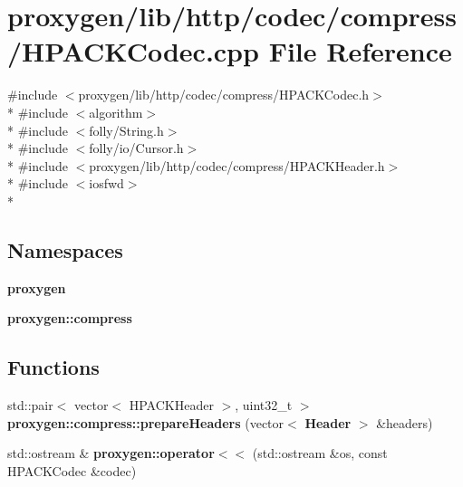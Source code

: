 \section{proxygen/lib/http/codec/compress/\+H\+P\+A\+C\+K\+Codec.cpp File Reference}
\label{HPACKCodec_8cpp}
{\ttfamily \#include $<$proxygen/lib/http/codec/compress/\+H\+P\+A\+C\+K\+Codec.\+h$>$}\\*
{\ttfamily \#include $<$algorithm$>$}\\*
{\ttfamily \#include $<$folly/\+String.\+h$>$}\\*
{\ttfamily \#include $<$folly/io/\+Cursor.\+h$>$}\\*
{\ttfamily \#include $<$proxygen/lib/http/codec/compress/\+H\+P\+A\+C\+K\+Header.\+h$>$}\\*
{\ttfamily \#include $<$iosfwd$>$}\\*
\subsection*{Namespaces}
\begin{DoxyCompactItemize}
\item 
 {\bf proxygen}
\item 
 {\bf proxygen\+::compress}
\end{DoxyCompactItemize}
\subsection*{Functions}
\begin{DoxyCompactItemize}
\item 
std\+::pair$<$ vector$<$ H\+P\+A\+C\+K\+Header $>$, uint32\+\_\+t $>$ {\bf proxygen\+::compress\+::prepare\+Headers} (vector$<$ {\bf Header} $>$ \&headers)
\item 
std\+::ostream \& {\bf proxygen\+::operator$<$$<$} (std\+::ostream \&os, const H\+P\+A\+C\+K\+Codec \&codec)
\end{DoxyCompactItemize}
